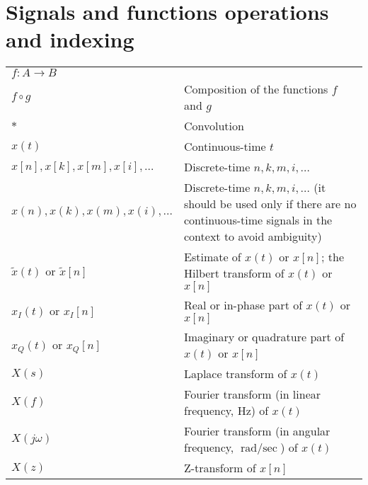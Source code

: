 \documentclass{article}
\begin{document}
\section{Signals and functions operations and indexing}
\begin{table}[H]
    \begin{tabularx}{\textwidth}{XX}
        \(f: A \rightarrow B\)& \\
        \(f \circ g\) & Composition of the functions \(f\) and \(g\)\\
        \(*\) & Convolution\\
        \(x(t)\) & Continuous-time \(t\)\\
        \(x[n], x[k], x[m], x[i], \dots\) & Discrete-time \(n, k, m, i, \dots\)\\
        \(x(n), x(k), x(m), x(i), \dots\) & Discrete-time \(n, k, m, i, \dots\) (it should be used only if there are no continuous-time signals in the context to avoid ambiguity)\\
        \(\tilde{x}(t)\) or \(\tilde{x}[n]\) & Estimate of \(x(t)\) or \(x[n]\); the Hilbert transform of \(x(t)\) or \(x[n]\)\\
        \(x_I(t)\) or \(x_I[n]\) & Real or in-phase part of \(x(t)\) or \(x[n]\)\\
        \(x_Q(t)\) or \(x_Q[n]\) & Imaginary or quadrature part of \(x(t)\) or \(x[n]\)\\
        \(X(s)\) & Laplace transform of \(x(t)\)\\
        \(X(f)\) & Fourier transform (in linear frequency, \(\unit{\Hz}\)) of \(x(t)\)\\
        \(X(j\omega)\) & Fourier transform (in angular frequency, \(\unit{\radian\per\sec}\)) of \(x(t)\)\\
        \(X(z)\) & Z-transform of \(x[n]\)
    \end{tabularx}
\end{table}
\end{document}
